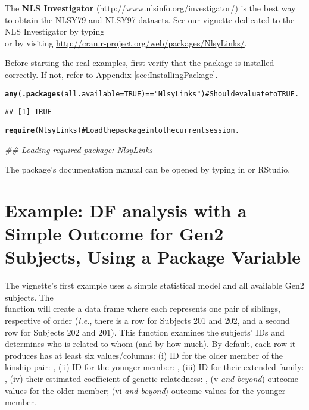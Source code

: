 \documentclass[letterpaper]{article}\usepackage{graphicx, color}
\makeatletter
\newcommand{\hlfunctioncall}[1]{\textcolor[rgb]{0.501960784313725,0,0.329411764705882}{\textbf{#1}}}%
\newcommand{\hlstring}[1]{\textcolor[rgb]{0.6,0.6,1}{#1}}%
\newcommand{\hlcomment}[1]{\textcolor[rgb]{0.180392156862745,0.6,0.341176470588235}{#1}}%
\newenvironment{kframe}{%
 \def\at@end@of@kframe{}%
 \ifinner\ifhmode%
  \def\at@end@of@kframe{\end{minipage}}%
  \begin{minipage}{\columnwidth}%
 \fi\fi%
 \def\FrameCommand##1{\hskip\@totalleftmargin \hskip-\fboxsep
 \colorbox{shadecolor}{##1}\hskip-\fboxsep
     \hskip-\linewidth \hskip-\@totalleftmargin \hskip\columnwidth}%
 \MakeFramed {\advance\hsize-\width
   \@totalleftmargin\z@ \linewidth\hsize
   \@setminipage}}%
 {\par\unskip\endMakeFramed%
 \at@end@of@kframe}
\newenvironment{knitrout}{}{} %
\makeatother
\begin{document}
The \textbf{NLS Investigator}\label{term:NlsInvestigator} (\url{http://www.nlsinfo.org/investigator/}) is the best way to obtain the NLSY79 and NLSY97 datasets.  See our vignette dedicated to the NLS Investigator by typing\\  or by visiting \url{http://cran.r-project.org/web/packages/NlsyLinks/}.

Before starting the real examples, first verify that the  package is installed correctly.  If not, refer to \hyperref[sec:InstallingPackage]{Appendix \ref*{sec:InstallingPackage}}.
\begin{knitrout}
\color{fgcolor}\begin{kframe}
\begin{alltt}
\hlfunctioncall{any}(\hlfunctioncall{.packages}(all.available = TRUE) == \hlstring{"NlsyLinks"})  #Should evaluate to TRUE.
\end{alltt}
\begin{verbatim}
## [1] TRUE
\end{verbatim}
\begin{alltt}
\hlfunctioncall{require}(NlsyLinks)  \hlcomment{#Load the package into the current session.}
\end{alltt}


{\ttfamily\noindent\itshape\textcolor{messagecolor}{\#\# Loading required package: NlsyLinks}}\end{kframe}
\end{knitrout}

The package's documentation manual can be opened by typing  in
\R{} or RStudio.

\section{Example: DF analysis with a Simple Outcome for Gen2 Subjects, Using a Package Variable}
The vignette's first example uses a simple statistical model and all available Gen2 subjects.  The \\ function will create a data frame where each represents one pair of siblings, respective of order (\emph{i.e.}, there is a row for Subjects 201 and 202, and a second row for Subjects 202 and 201). This function examines the subjects' IDs and determines who is related to whom (and by how much).  By default, each row it produces has at least six values/columns: (i) ID for the older member of the kinship pair: , (ii) ID for the younger member: , (iii) ID for their extended family: , (iv) their estimated coefficient of genetic relatedness: , (v \emph{and beyond}) outcome values for the older member; (vi \emph{and beyond}) outcome values for the younger member.  
\end{document}
